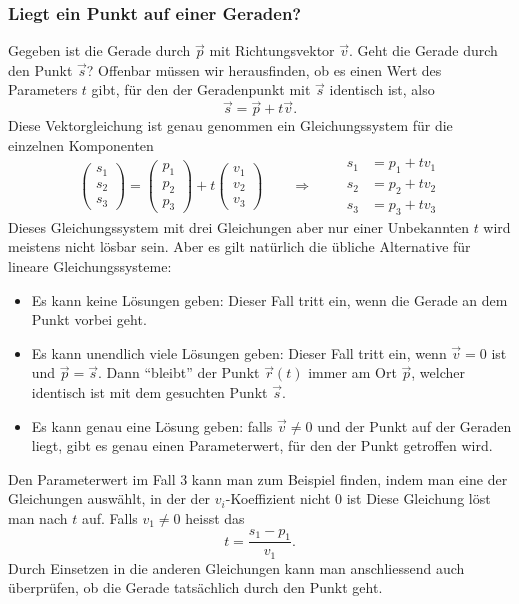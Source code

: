 \subsubsection{Liegt ein Punkt auf einer Geraden?}
Gegeben ist die Gerade durch $\vec p$ mit Richtungsvektor $\vec v$.
Geht die
Gerade durch den Punkt $\vec s$? Offenbar müssen wir herausfinden, ob es
einen Wert des Parameters $t$ gibt, für den der Geradenpunkt mit $\vec s$
identisch ist, also
\[
\vec s = \vec p + t\vec v.
\]
Diese Vektorgleichung ist genau genommen ein Gleichungssystem für die einzelnen
Komponenten
\[
\begin{pmatrix}
s_1\\s_2\\s_3
\end{pmatrix}
=
\begin{pmatrix}
p_1\\p_2\\p_3
\end{pmatrix}
+t
\begin{pmatrix}
v_1\\v_2\\v_3
\end{pmatrix}
\qquad
\Rightarrow
\qquad
\begin{aligned}
s_1&=p_1+tv_1\\
s_2&=p_2+tv_2\\
s_3&=p_3+tv_3
\end{aligned}
\]
Dieses Gleichungssystem mit drei Gleichungen aber nur einer Unbekannten $t$
wird meistens nicht lösbar sein.
Aber es gilt natürlich die übliche Alternative
für lineare Gleichungssysteme:
\begin{itemize}
\item Es kann keine Lösungen geben: Dieser Fall tritt ein, wenn die Gerade
an dem Punkt vorbei geht.
\item Es kann unendlich viele Lösungen geben: Dieser Fall tritt ein, wenn
$\vec v=0$ ist und $\vec p=\vec s$.
Dann ``bleibt'' der Punkt $\vec r(t)$
immer am Ort $\vec p$, welcher identisch ist mit dem gesuchten Punkt $\vec s$.
\item Es kann genau eine Lösung geben: falls $\vec v\ne 0$ und der Punkt auf der
Geraden liegt, gibt es genau einen Parameterwert, für den der Punkt
getroffen wird.
\end{itemize}
Den Parameterwert im Fall 3 kann man zum Beispiel finden, indem man eine
der Gleichungen auswählt, in der der $v_i$-Koeffizient nicht $0$ ist
Diese Gleichung löst man nach $t$ auf.
Falls $v_1\ne 0$ heisst das
\[
t=\frac{s_1-p_1}{v_1}.
\]
Durch Einsetzen in die anderen Gleichungen kann man anschliessend auch überprüfen,
ob die Gerade tatsächlich durch den Punkt geht.

